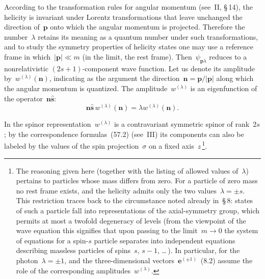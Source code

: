 According to the transformation rules for angular momentum (see~II, \S\,14), the helicity is invariant under Lorentz transformations that leave unchanged the direction of~$\mathbf{p}$ onto which the angular momentum is projected. Therefore the number~$\lambda$ retains its meaning as a quantum number under such transformations, and to study the symmetry properties of helicity states one may use a reference frame in which~$|\mathbf{p}| \ll m$ (in the limit, the rest frame). Then~$\psi_{\mathbf{p}\lambda}$ reduces to a nonrelativistic $(2s+1)$-component wave function. Let us denote its amplitude by~$w^{(\lambda)}(\mathbf{n})$, indicating as the argument the direction~$\mathbf{n} = \mathbf{p}/|\mathbf{p}|$ along which the angular momentum is quantized. The amplitude~$w^{(\lambda)}$ is an eigenfunction of the operator~$\mathbf{n}\hat{\mathbf{s}}$:
\begin{equation}
\mathbf{n}\hat{\mathbf{s}}\,w^{(\lambda)}(\mathbf{n}) = \lambda w^{(\lambda)}(\mathbf{n}).
\tag{16.1}
\end{equation}

In the spinor representation~$w^{(\lambda)}$ is a contravariant symmetric spinor of rank~$2s$; by the correspondence formulas~(57.2) (see~III) its components can also be labeled by the values of the spin projection~$\sigma$ on a fixed axis~$z$\,\footnote{The reasoning given here (together with the listing of allowed values of~$\lambda$) pertains to particles whose mass differs from zero. For a particle of zero mass no rest frame exists, and the helicity admits only the two values~$\lambda = \pm s$. This restriction traces back to the circumstance noted already in~\S\,8: states of such a particle fall into representations of the axial-symmetry group, which permits at most a twofold degeneracy of levels (from the viewpoint of the wave equation this signifies that upon passing to the limit~$m \to 0$ the system of equations for a spin-$s$ particle separates into independent equations describing massless particles of spins~$s$, $s - 1$, \ldots\,). In particular, for the photon~$\lambda = \pm 1$, and the three-dimensional vectors~$\mathbf{e}^{(\pm1)}$~(8.2) assume the role of the corresponding amplitudes~$w^{(\lambda)}$.}.

